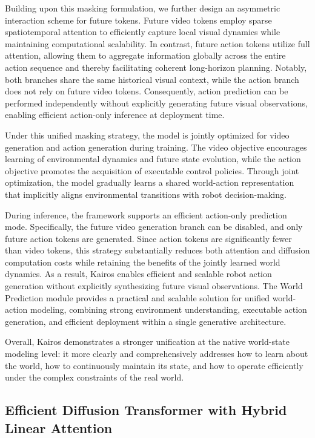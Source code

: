 Building upon this masking formulation, we further design an asymmetric interaction scheme for future tokens. Future video tokens employ sparse spatiotemporal attention to efficiently capture local visual dynamics while maintaining computational scalability. In contrast, future action tokens utilize full attention, allowing them to aggregate information globally across the entire action sequence and thereby facilitating coherent long-horizon planning. Notably, both branches share the same historical visual context, while the action branch does not rely on future video tokens. Consequently, action prediction can be performed independently without explicitly generating future visual observations, enabling efficient action-only inference at deployment time.


Under this unified masking strategy, the model is jointly optimized for video generation and action generation during training. The video objective encourages learning of environmental dynamics and future state evolution, while the action objective promotes the acquisition of executable control policies. Through joint optimization, the model gradually learns a shared world-action representation that implicitly aligns environmental transitions with robot decision-making.

During inference, the framework supports an efficient action-only prediction mode. Specifically, the future video generation branch can be disabled, and only future action tokens are generated. Since action tokens are significantly fewer than video tokens, this strategy substantially reduces both attention and diffusion computation costs while retaining the benefits of the jointly learned world dynamics. As a result, Kairos enables efficient and scalable robot action generation without explicitly synthesizing future visual observations.
The World Prediction module provides a practical and scalable solution for unified world-action modeling, combining strong environment understanding, executable action generation, and efficient deployment within a single generative architecture.


Overall, Kairos demonstrates a stronger unification at the native world-state modeling level: it more clearly and comprehensively addresses how to learn about the world, how to continuously maintain its state, and how to operate efficiently under the complex constraints of the real world.




\subsection{Efficient Diffusion Transformer with Hybrid Linear Attention}\label{sec:attention}


